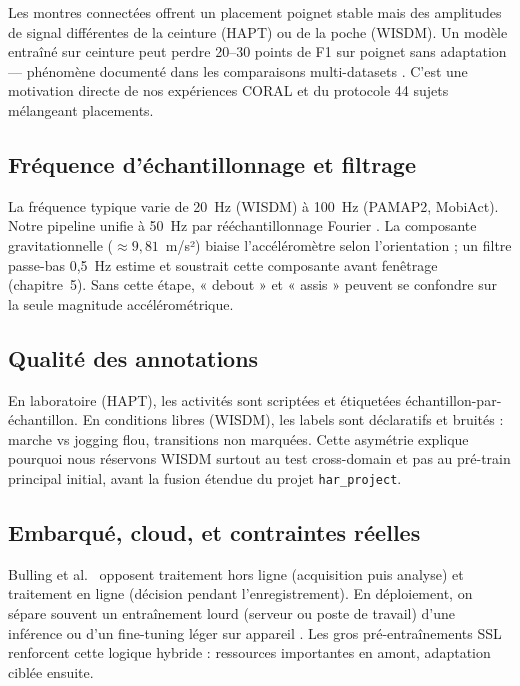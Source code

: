 \documentclass[a4paper,12pt]{report}
\begin{document}
Les montres connectées offrent un placement poignet stable mais des amplitudes
de signal différentes de la ceinture (HAPT) ou de la poche (WISDM). Un modèle
entraîné sur ceinture peut perdre 20--30 points de F1 sur poignet sans
adaptation — phénomène documenté dans les comparaisons multi-datasets
\parencite{amrani2025}. C'est une motivation directe de nos expériences CORAL
et du protocole 44 sujets mélangeant placements.

\subsection{Fréquence d'échantillonnage et filtrage}

La fréquence typique varie de 20~Hz (WISDM) à 100~Hz (PAMAP2, MobiAct). Notre
pipeline unifie à 50~Hz par rééchantillonnage Fourier \parencite{amrani2025}.
La composante gravitationnelle ($\approx 9,81$~m/s²) biaise l'accéléromètre
selon l'orientation ; un filtre passe-bas 0,5~Hz estime et soustrait cette
composante avant fenêtrage (chapitre~5). Sans cette étape, « debout » et
« assis » peuvent se confondre sur la seule magnitude accélérométrique.

\subsection{Qualité des annotations}

En laboratoire (HAPT), les activités sont scriptées et étiquetées
échantillon-par-échantillon. En conditions libres (WISDM), les labels sont
déclaratifs et bruités : marche vs jogging flou, transitions non marquées.
Cette asymétrie explique pourquoi nous réservons WISDM surtout au test
cross-domain et pas au pré-train principal initial, avant la fusion étendue
du projet \texttt{har\_project}.

\subsection{Embarqué, cloud, et contraintes réelles}

Bulling et al.\ \parencite{bulling2014} opposent traitement hors ligne (acquisition
puis analyse) et traitement en ligne (décision pendant l'enregistrement). En
déploiement, on sépare souvent un entraînement lourd (serveur ou poste de travail)
d'une inférence ou d'un fine-tuning léger sur appareil
\parencite{amrani2025,mazankiewicz2020}. Les gros pré-entraînements SSL
\parencite{yuan2024} renforcent cette logique hybride : ressources importantes en
amont, adaptation ciblée ensuite.
\end{document}
